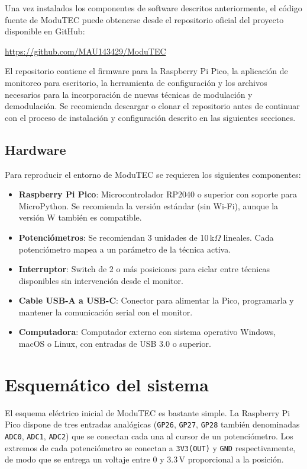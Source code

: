\documentclass[12pt,letterpaper]{report}
\begin{document}
Una vez instalados los componentes de software descritos anteriormente, el código fuente de ModuTEC puede obtenerse desde el repositorio oficial del proyecto disponible en GitHub:

\begin{center}
\url{https://github.com/MAU143429/ModuTEC}
\end{center}

El repositorio contiene el firmware para la Raspberry Pi Pico, la aplicación de monitoreo para escritorio, la herramienta de configuración y los archivos necesarios para la incorporación de nuevas técnicas de modulación y demodulación. Se recomienda descargar o clonar el repositorio antes de continuar con el proceso de instalación y configuración descrito en las siguientes secciones.

\subsection{Hardware}
\label{subsec:hardware}

Para reproducir el entorno de ModuTEC se requieren los siguientes componentes:

\begin{itemize}
  \item \textbf{Raspberry Pi Pico}: Microcontrolador RP2040 o superior con soporte para
        MicroPython. Se recomienda la versión estándar (sin Wi-Fi), aunque la versión W
        también es compatible.
  \item \textbf{Potenciómetros}: Se recomiendan 3 unidades de 10\,k$\Omega$ lineales. Cada
        potenciómetro mapea a un parámetro de la técnica activa.
  \item \textbf{Interruptor}: Switch de 2 o más posiciones para ciclar entre técnicas disponibles
        sin intervención desde el monitor.
  \item \textbf{Cable USB-A a USB-C}: Conector para alimentar la Pico, programarla y
        mantener la comunicación serial con el monitor.
  \item \textbf{Computadora}: Computador externo con sistema operativo Windows, macOS o Linux,
        con entradas de USB 3.0 o superior.
\end{itemize}

\section{Esquemático del sistema}

El esquema eléctrico inicial de ModuTEC es bastante simple. La Raspberry Pi Pico dispone
de tres entradas analógicas (\texttt{GP26}, \texttt{GP27}, \texttt{GP28} también
denominadas \texttt{ADC0}, \texttt{ADC1}, \texttt{ADC2}) que se conectan cada una al
cursor de un potenciómetro. Los extremos de cada potenciómetro se conectan a
\texttt{3V3(OUT)} y \texttt{GND} respectivamente, de modo que se entrega un
voltaje entre 0 y 3.3\,V proporcional a la posición.
\end{document}
